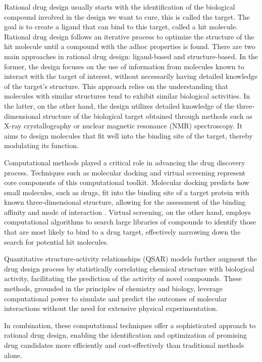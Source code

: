Rational drug design usually starts with the identification of the biological compound involved in the design we want to cure, this is called the target. The goal is to create a ligand that can bind to this target, called a hit molecule. Rational drug design follows an iterative process to optimize the structure of the hit molecule until a compound with the adhoc properties is found. There are two main approaches in rational drug design: ligand-based and structure-based. In the former, the design focuses on the use of information from molecules known to interact with the target of interest, without necessarily having detailed knowledge of the target's structure. This approach relies on the understanding that molecules with similar structures tend to exhibit similar biological activities. In the latter, on the other hand, the design utilizes detailed knowledge of the three-dimensional structure of the biological target obtained through methods such as X-ray crystallography or nuclear magnetic resonance (NMR) spectroscopy. It aims to design molecules that fit well into the binding site of the target, thereby modulating its function. \cite{WilsonLill2011}

Computational methods played a critical role in advancing the drug discovery process. Techniques such as molecular docking and virtual screening represent core components of this computational toolkit. Molecular docking predicts how small molecules, such as drugs, fit into the binding site of a target protein with known three-dimensional structure, allowing for the assessment of the binding affinity and mode of interaction \cite{STANZIONE2021273}. Virtual screening, on the other hand, employs computational algorithms to search large libraries of compounds to identify those that are most likely to bind to a drug target, effectively narrowing down the search for potential hit molecules. \cite{virtualscreening}

Quantitative structure-activity relationships (QSAR) models further augment the drug design process by statistically correlating chemical structure with biological activity, facilitating the prediction of the activity of novel compounds. \cite{BELFIELD2023100251} These methods, grounded in the principles of chemistry and biology, leverage computational power to simulate and predict the outcomes of molecular interactions without the need for extensive physical experimentation.

In combination, these computational techniques offer a sophisticated approach to rational drug design, enabling the identification and optimization of promising drug candidates more efficiently and cost-effectively than traditional methods alone.

